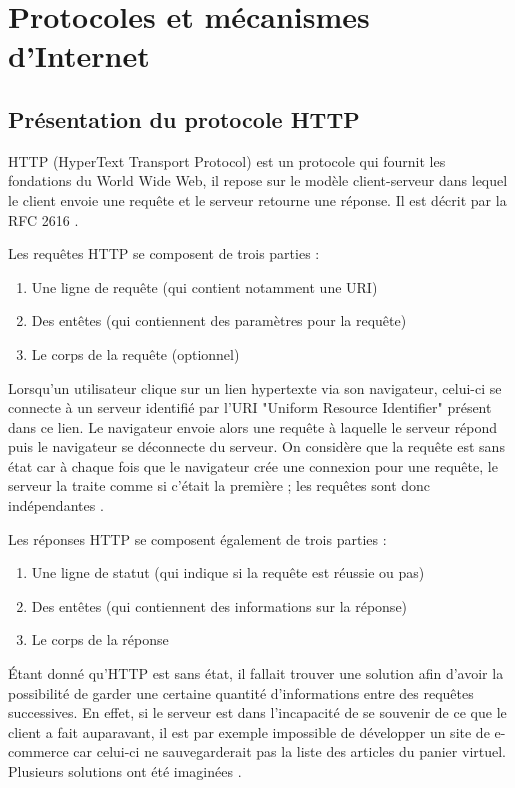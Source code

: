 \chapter{Protocoles et mécanismes d'Internet}

\section{Présentation du protocole HTTP}
HTTP (HyperText Transport Protocol) \cite{Obo_CNP3} est un protocole qui fournit les fondations du World Wide Web, il repose sur le modèle client-serveur dans lequel le client envoie une requête et le serveur retourne une réponse. Il est décrit par la RFC 2616 \cite{IETF_RFC2616}.

Les requêtes HTTP se composent de trois parties :
\begin{enumerate}
	\item Une ligne de requête (qui contient notamment une URI)
	\item Des entêtes (qui contiennent des paramètres pour la requête)
	\item Le corps de la requête (optionnel)
	\newline
\end{enumerate}

Lorsqu'un utilisateur clique sur un lien hypertexte via son navigateur, celui-ci se connecte à un serveur identifié par l'URI "Uniform Resource Identifier" présent dans ce lien. Le navigateur envoie alors une requête à laquelle le serveur répond puis le navigateur se déconnecte du serveur. On considère que la requête est sans état car à chaque fois que le navigateur crée une connexion pour une requête, le serveur la traite comme si c'était la première ; les requêtes sont donc indépendantes \cite{Obo_CNP3}.

Les réponses HTTP se composent également de trois parties :
\begin{enumerate}
	\item Une ligne de statut (qui indique si la requête est réussie ou pas)
	\item Des entêtes (qui contiennent des informations sur la réponse)
	\item Le corps de la réponse
	\newline
\end{enumerate}

Étant donné qu'HTTP est sans état, il fallait trouver une solution afin d'avoir la possibilité de garder une certaine quantité d'informations entre des requêtes successives. En effet, si le serveur est dans l'incapacité de se souvenir de ce que le client a fait auparavant, il est par exemple impossible de développer un site de e-commerce car celui-ci ne sauvegarderait pas la liste des articles du panier virtuel. Plusieurs solutions ont été imaginées \cite{Obo_CNP3}.


